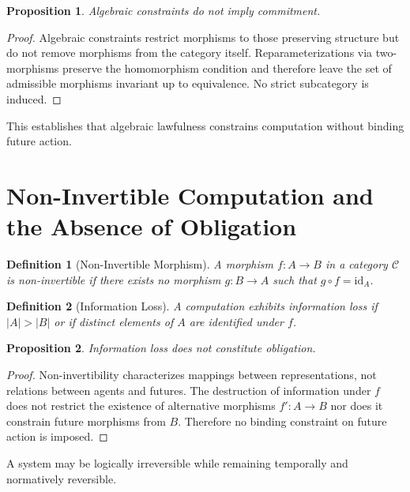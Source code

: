 \documentclass[11pt]{article}
\newtheorem{definition}{Definition}
\newtheorem{proposition}{Proposition}
\begin{document}
\begin{proposition}
Algebraic constraints do not imply commitment.
\end{proposition}

\begin{proof}
Algebraic constraints restrict morphisms to those preserving structure but do
not remove morphisms from the category itself. Reparameterizations via
two-morphisms preserve the homomorphism condition and therefore leave the set of
admissible morphisms invariant up to equivalence. No strict subcategory is
induced.
\end{proof}

This establishes that algebraic lawfulness constrains computation without
binding future action.

\section{Non-Invertible Computation and the Absence of Obligation}

\begin{definition}[Non-Invertible Morphism]
A morphism $f : A \to B$ in a category $\mathcal{C}$ is \emph{non-invertible} if
there exists no morphism $g : B \to A$ such that $g \circ f = \mathrm{id}_A$.
\end{definition}

\begin{definition}[Information Loss]
A computation exhibits \emph{information loss} if $|A| > |B|$ or if distinct
elements of $A$ are identified under $f$.
\end{definition}

\begin{proposition}
Information loss does not constitute obligation.
\end{proposition}

\begin{proof}
Non-invertibility characterizes mappings between representations, not relations
between agents and futures. The destruction of information under $f$ does not
restrict the existence of alternative morphisms $f' : A \to B$ nor does it
constrain future morphisms from $B$. Therefore no binding constraint on future
action is imposed.
\end{proof}

\begin{corollary}
A system may be logically irreversible while remaining temporally and normatively
reversible.
\end{corollary}
\end{document}

